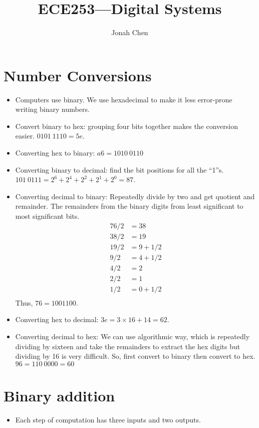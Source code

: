 \documentclass[a4paper, 10pt]{article}
\title{ECE253---Digital Systems}
\author{Jonah Chen}
\numberwithin{equation}{section}
\begin{document}
\sffamily
\maketitle
\tableofcontents

\section{Number Conversions}

\begin{itemize}
    \item Computers use binary. We use hexadecimal to make it less error-prone writing binary numbers.
    \item Convert binary to hex: grouping four bits together makes the conversion easier. $0101\:1110=5e$.
    \item Converting hex to binary: $a6=1010\:0110$
    \item Converting binary to decimal: find the bit positions for all the ``1''s. $101\:0111=2^6+2^4+2^2+2^1+2^0=87$.
    \item Converting decimal to binary: Repeatedly divide by two and get quotient and remainder. The remainders from the binary digits from least significant to most significant bits.
    \begin{align*}
        76/2&=38\\
        38/2&=19\\
        19/2&=9+1/2\\
        9/2&=4+1/2\\
        4/2&=2\\
        2/2&=1\\
        1/2&=0+1/2\\
    \end{align*}
    Thus, $76=1001100$. 
    \item Converting hex to decimal: $3e=3\times 16+14=62$.
    \item Converting decimal to hex: We can use algorithmic way, which is repeatedly dividing by sixteen and take the remainders to extract the hex digits but dividing by 16 is very difficult. So, first convert to binary then convert to hex. $96=110\:0000=60$
\end{itemize}

\section{Binary addition}
\begin{itemize}
    \item Each step of computation has three inputs and two outputs. 
\end{itemize}
\end{document}
